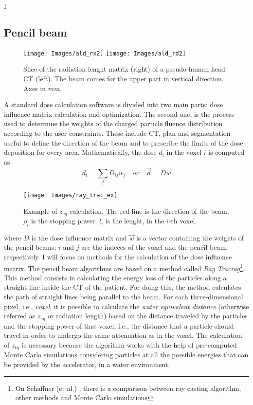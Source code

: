 \documentclass[12pt, a4paper, twoside]{book}
\begin{document}
I 

\subsection{Pencil beam} 
\label{sec:pen}
\begin{figure}[!b]
\centering
\texttt{[image: Images/ald\_rx2]}
\texttt{[image: Images/ald\_rd2]}
\caption{Slice of the radiation lenght matrix (right) of a pseudo-human head CT (left). The beam comes for the upper part in vertical direction. Axes in $mm$. }
\label{fig:rd}
\end{figure}
A standard dose calculation software is divided into two main parts: dose influence matrix calculation and optimization. The second one, is the process used to determine the weights of the charged particle fluence distribution according to the user constraints. These include CT, plan and segmentation useful to define the direction of the beam and to prescribe the limits of the dose deposition for every area.
Mathematically, the dose $d_i$ in the voxel $i$ is computed as
\[
d_i = \sum_j D_{ij}w_j\,\,\,\,\,\,\textit{or:}\,\,\,\,\,\vec{d} = D\vec{w}
\]
\begin{wrapfigure}{r}{.6\textwidth}
\vspace{-5mm}
{\texttt{[image: Images/ray\_trac\_ex]}}
\caption{Example of $z_{eq}$ calculation. The red line is the direction of the beam, $\rho_i$ is the stopping power, $l_i$ is the lenght, in the $i$-th voxel.}
\label{fig:rayt}
\end{wrapfigure}
where $D$ is the dose influence matrix and $\vec{w}$ is a vector containing the weights of the pencil beams; $i$ and $j$ are the indeces of the voxel and the pencil beam, respectively.
I will focus on methods for the calculation of the dose influence matrix.
The pencil beam algorithms are based on a method called \emph{Ray Tracing}\footnote{On Schaffner (et al.) \cite{schaf:pba}, there is a comparison between ray casting algorithm, other methods and Monte Carlo simulations}. This method consists in calculating the energy loss of the particles along a straight line inside the CT of the patient. For doing this, the method calculates the path of straight lines being parallel to the beam. For each three-dimensional pixel, i.e., \emph{voxel}, it is possible to calculate the \emph{water equivalent distance} (otherwise referred as $z_{eq}$ or radiation length) based on the distance traveled by the particles and the stopping power of that voxel, i.e., the distance that a particle should travel in order to undergo the same attenuation as in the voxel. The calculation of $z_{eq}$ is necessary because the algorithm works with the help of pre-computed Monte Carlo simulations considering particles at all the possible energies that can be provided by the accelerator, in a water environment. 
\end{document}
